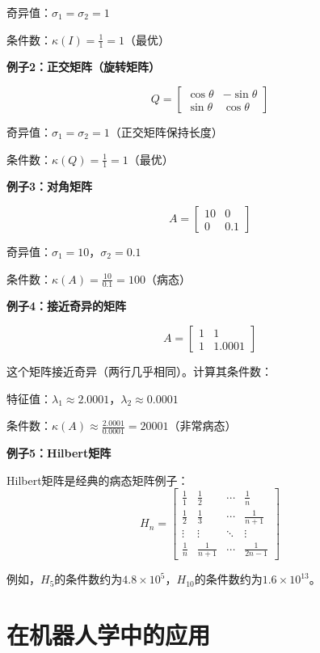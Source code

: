 \documentclass[12pt,a4paper]{article}
\begin{document}
奇异值：$\sigma_1 = \sigma_2 = 1$

条件数：$\kappa(I) = \frac{1}{1} = 1$（最优）

\textbf{例子2：正交矩阵（旋转矩阵）}

$$Q = \begin{bmatrix} \cos\theta & -\sin\theta \\ \sin\theta & \cos\theta \end{bmatrix}$$

奇异值：$\sigma_1 = \sigma_2 = 1$（正交矩阵保持长度）

条件数：$\kappa(Q) = \frac{1}{1} = 1$（最优）

\textbf{例子3：对角矩阵}

$$A = \begin{bmatrix} 10 & 0 \\ 0 & 0.1 \end{bmatrix}$$

奇异值：$\sigma_1 = 10$，$\sigma_2 = 0.1$

条件数：$\kappa(A) = \frac{10}{0.1} = 100$（病态）

\textbf{例子4：接近奇异的矩阵}

$$A = \begin{bmatrix} 1 & 1 \\ 1 & 1.0001 \end{bmatrix}$$

这个矩阵接近奇异（两行几乎相同）。计算其条件数：

特征值：$\lambda_1 \approx 2.0001$，$\lambda_2 \approx 0.0001$

条件数：$\kappa(A) \approx \frac{2.0001}{0.0001} = 20001$（非常病态）

\textbf{例子5：Hilbert矩阵}

Hilbert矩阵是经典的病态矩阵例子：
\begin{equation}
H_n = \begin{bmatrix}
\frac{1}{1} & \frac{1}{2} & \cdots & \frac{1}{n} \\
\frac{1}{2} & \frac{1}{3} & \cdots & \frac{1}{n+1} \\
\vdots & \vdots & \ddots & \vdots \\
\frac{1}{n} & \frac{1}{n+1} & \cdots & \frac{1}{2n-1}
\end{bmatrix}
\end{equation}

例如，$H_5$的条件数约为$4.8 \times 10^5$，$H_{10}$的条件数约为$1.6 \times 10^{13}$。

\section{在机器人学中的应用}
\end{document}
